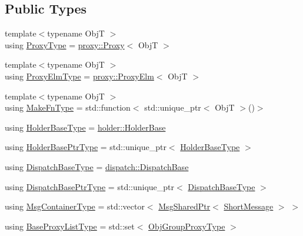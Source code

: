 \subsection*{Public Types}
\begin{DoxyCompactItemize}
\item 
{\footnotesize template$<$typename ObjT $>$ }\\using \hyperlink{structvt_1_1objgroup_1_1_obj_group_manager_aea65eef52f240a52210132eef5ce591f}{Proxy\+Type} = \hyperlink{structvt_1_1objgroup_1_1proxy_1_1_proxy}{proxy\+::\+Proxy}$<$ ObjT $>$
\item 
{\footnotesize template$<$typename ObjT $>$ }\\using \hyperlink{structvt_1_1objgroup_1_1_obj_group_manager_adba6c8ecb0f4c30e719f1abb995cfc9b}{Proxy\+Elm\+Type} = \hyperlink{structvt_1_1objgroup_1_1proxy_1_1_proxy_elm}{proxy\+::\+Proxy\+Elm}$<$ ObjT $>$
\item 
{\footnotesize template$<$typename ObjT $>$ }\\using \hyperlink{structvt_1_1objgroup_1_1_obj_group_manager_a397d787b3876752a6d70511b2769b872}{Make\+Fn\+Type} = std\+::function$<$ std\+::unique\+\_\+ptr$<$ ObjT $>$()$>$
\item 
using \hyperlink{structvt_1_1objgroup_1_1_obj_group_manager_a4898fc9cabf44890e5593f8c4ab86230}{Holder\+Base\+Type} = \hyperlink{structvt_1_1objgroup_1_1holder_1_1_holder_base}{holder\+::\+Holder\+Base}
\item 
using \hyperlink{structvt_1_1objgroup_1_1_obj_group_manager_ac1e9bb19d4a5923dd6d595bad28f04c9}{Holder\+Base\+Ptr\+Type} = std\+::unique\+\_\+ptr$<$ \hyperlink{structvt_1_1objgroup_1_1_obj_group_manager_a4898fc9cabf44890e5593f8c4ab86230}{Holder\+Base\+Type} $>$
\item 
using \hyperlink{structvt_1_1objgroup_1_1_obj_group_manager_ae89a82f6bfca9bbd007791f1cac88f8f}{Dispatch\+Base\+Type} = \hyperlink{structvt_1_1objgroup_1_1dispatch_1_1_dispatch_base}{dispatch\+::\+Dispatch\+Base}
\item 
using \hyperlink{structvt_1_1objgroup_1_1_obj_group_manager_a8f2ded4cfa63faa119c2bd550764878f}{Dispatch\+Base\+Ptr\+Type} = std\+::unique\+\_\+ptr$<$ \hyperlink{structvt_1_1objgroup_1_1_obj_group_manager_ae89a82f6bfca9bbd007791f1cac88f8f}{Dispatch\+Base\+Type} $>$
\item 
using \hyperlink{structvt_1_1objgroup_1_1_obj_group_manager_ab89e17bd301b2aa684fce22f0b4af30a}{Msg\+Container\+Type} = std\+::vector$<$ \hyperlink{namespacevt_ab2b3d506ec8e8d1540aede826d84a239}{Msg\+Shared\+Ptr}$<$ \hyperlink{namespacevt_a1125ac1da6c0bbf141e0ea0739d7602d}{Short\+Message} $>$ $>$
\item 
using \hyperlink{structvt_1_1objgroup_1_1_obj_group_manager_a497383a759f7426e824b4f7475b3d5d3}{Base\+Proxy\+List\+Type} = std\+::set$<$ \hyperlink{namespacevt_ad7cae989df485fccca57f0792a880a8e}{Obj\+Group\+Proxy\+Type} $>$
\end{DoxyCompactItemize}
